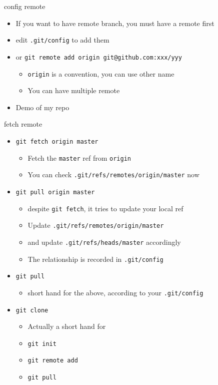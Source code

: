 \documentclass[aspectratio=169]{beamer}
\newcommand{\T}[1]{\texttt{#1}}
\begin{document}
\begin{frame}{config remote}
  \begin{itemize}
    \item If you want to have remote branch, you must have a remote first
    \item edit \T{.git/config} to add them
    \item or \T{git remote add origin git@github.com:xxx/yyy}\begin{itemize}
      \item \T{origin} is a convention, you can use other name
      \item You can have multiple remote
    \end{itemize}
    \item Demo of my repo
  \end{itemize}
\end{frame}

\begin{frame}{fetch remote}
  \begin{itemize}
    \item<1-> \T{git fetch origin master}\begin{itemize}
      \item Fetch the \T{master} ref from \T{origin}
      \item You can check \T{.git/refs/remotes/origin/master} now
    \end{itemize}
    \item<2-> \T{git pull origin master}\begin{itemize}
      \item despite \T{git fetch}, it tries to update your local ref
      \item Update \T{.git/refs/remotes/origin/master}
      \item and update \T{.git/refs/heads/master} accordingly
      \item The relationship is recorded in \T{.git/config}
    \end{itemize}
    \item<3-> \T{git pull}\begin{itemize}
      \item short hand for the above, according to your \T{.git/config}
    \end{itemize}
    \item<4-> \T{git clone}\begin{itemize}
      \item Actually a short hand for
      \item \T{git init}
      \item \T{git remote add}
      \item \T{git pull}
    \end{itemize}
  \end{itemize}
\end{frame}
\end{document}
